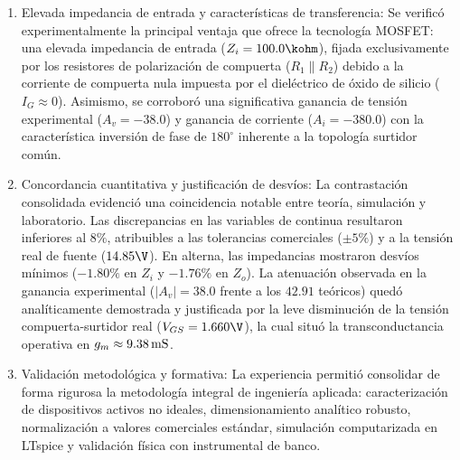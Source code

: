 \begin{enumerate}
  \item Elevada impedancia de entrada y características de transferencia: Se verificó experimentalmente la principal
    ventaja que ofrece la tecnología MOSFET: una elevada impedancia de entrada ($Z_i = 100.0\kohm$), fijada
    exclusivamente por los resistores de polarización de compuerta ($R_1 \parallel R_2$) debido a la corriente de compuerta
    nula impuesta por el dieléctrico de óxido de silicio ($I_G \approx 0$). Asimismo, se corroboró una significativa
    ganancia de tensión experimental ($A_v = -38.0$) y ganancia de corriente ($A_i = -380.0$) con la característica
    inversión de fase de $180^\circ$ inherente a la topología surtidor común.

  \item Concordancia cuantitativa y justificación de desvíos: La contrastación consolidada evidenció una coincidencia
    notable entre teoría, simulación y laboratorio. Las discrepancias en las variables de continua resultaron inferiores
    al $8\%$, atribuibles a las tolerancias comerciales ($\pm 5\%$) y a la tensión real de fuente ($14.85\V$). En alterna,
    las impedancias mostraron desvíos mínimos ($-1.80\%$ en $Z_i$ y $-1.76\%$ en $Z_o$). La atenuación observada en la
    ganancia experimental ($|A_v| = 38.0$ frente a los $42.91$ teóricos) quedó analíticamente demostrada y justificada por
    la leve disminución de la tensión compuerta-surtidor real ($V_{GS} = 1.660\V$), la cual situó la transconductancia
    operativa en $g_m \approx 9.38\,\mathrm{mS}$.

  \item Validación metodológica y formativa: La experiencia permitió consolidar de forma rigurosa la metodología
    integral de ingeniería aplicada: caracterización de dispositivos activos no ideales, dimensionamiento analítico
    robusto, normalización a valores comerciales estándar, simulación computarizada en LTspice y validación física con
    instrumental de banco.
\end{enumerate}
